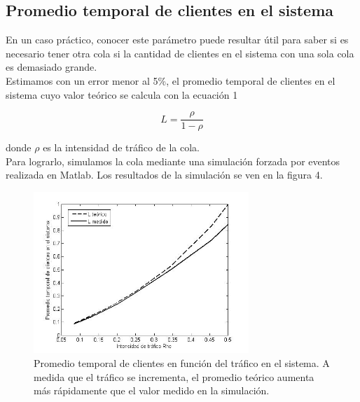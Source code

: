 \documentclass[10pt,journal,compsoc]{IEEEtran}
\begin{document}
\subsection{Promedio temporal de clientes en el sistema} %
En un caso pr\'actico, conocer este par\'ametro puede resultar \'util para saber si es necesario
tener otra cola si la cantidad de clientes en el sistema con una sola cola es demasiado grande.\\
Estimamos con un error menor al 5\%, el promedio temporal de clientes en el sistema
cuyo valor te\'orico se calcula con la ecuaci\'on 1

\begin{equation}
L = \frac{\rho}{1-\rho}
\end{equation}

donde $\rho$ es la intensidad de tr\'afico de la cola.\\
Para lograrlo, simulamos la cola mediante una simulaci\'on forzada por eventos realizada en Matlab.
Los resultados de la simulaci\'on se ven en la figura 4.

\begin{figure}[t]%
\label{fig:puntouno}
\begin{center}
\centering
\includegraphics[width=3.2in]{L_rho.jpg}
\caption{Promedio temporal de clientes en funci\'on del tr\'afico en el sistema. A medida que el tr\'afico se incrementa, el promedio te\'orico aumenta m\'as r\'apidamente que el valor medido en la simulaci\'on.}
\end{center}
\end{figure}

\end{document}
